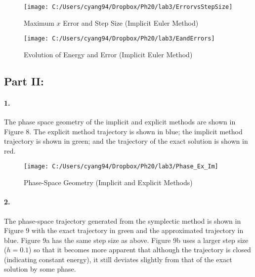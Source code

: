 \documentclass[english]{article}
\begin{document}
\begin{figure}[H]


\caption{Maximum $x$ Error and Step Size (Implicit Euler Method)}


\noindent \centering{}\texttt{[image: C:/Users/cyang94/Dropbox/Ph20/lab3/ErrorvsStepSize]}
\end{figure}


\begin{figure}[H]
\caption{Evolution of Energy and Error (Implicit Euler Method)}


\noindent \centering{}\texttt{[image: C:/Users/cyang94/Dropbox/Ph20/lab3/EandErrors]}
\end{figure}



\subsection*{\medskip{}
}


\subsection*{Part II:}


\paragraph{1. }

The phase space geometry of the implicit and explicit methods are
shown in Figure 8. The explicit method trajectory is shown in blue;
the implicit method trajectory is shown in green; and the trajectory
of the exact solution is shown in red.

\begin{figure}[H]
\caption{Phase-Space Geometry (Implicit and Explicit Methods)}


\noindent \centering{}\texttt{[image: C:/Users/cyang94/Dropbox/Ph20/lab3/Phase\_Ex\_Im]}
\end{figure}



\paragraph*{2.}

The phase-space trajectory generated from the symplectic method is
shown in Figure 9 with the exact trajectory in green and the approximated
trajectory in blue. Figure 9a has the same step size as above. Figure
9b uses a larger step size ($h=0.1$) so that it becomes more apparent
that although the trajectory is closed (indicating constant energy),
it still deviates slightly from that of the exact solution by some
phase.
\end{document}
